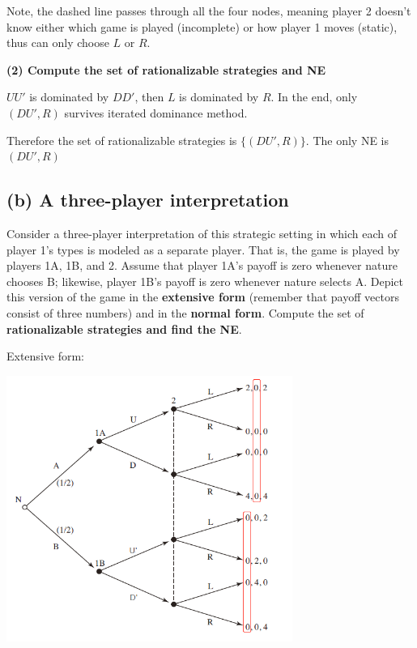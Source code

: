 \documentclass{article}
\begin{document}
\begin{mdframed}[backgroundcolor=blue!20,linecolor=white]
Note, the dashed line passes through all the four nodes, meaning player 2 doesn't know either which game is played (incomplete) or how player 1 moves (static), thus can only choose $L$ or $R$.
\end{mdframed}


\textbf{(2) Compute the set of rationalizable strategies and NE}
\vspace{2mm}

$UU'$ is dominated by $DD'$, then $L$ is dominated by $R$. In the end, only $(DU',R)$ survives iterated dominance method. 
\vspace{2mm}

Therefore the set of rationalizable strategies is $\{(DU',R)\}$. The only NE is $(DU',R)$

\subsection*{(b) A three-player interpretation } 

Consider a three-player interpretation of this strategic setting in which each of player 1's types is modeled as a separate player. That is, the
game is played by players 1A, 1B, and 2. Assume that player 1A's
payoff is zero whenever nature chooses B; likewise, player 1B's payoff
is zero whenever nature selects A. Depict this version of the game in the
\textbf{extensive form} (remember that payoff vectors consist of three numbers)
and in the \textbf{normal form}. Compute the set of \textbf{rationalizable strategies and
find the NE}.

\vspace{4mm}

Extensive form:

\begin{center}
\includegraphics[width=0.7\textwidth]{9.q26_3_b1}
\end{center}
\vspace{2mm}
\end{document}

